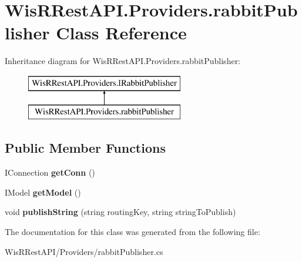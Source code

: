 \hypertarget{class_wis_r_rest_a_p_i_1_1_providers_1_1rabbit_publisher}{}\section{Wis\+R\+Rest\+A\+P\+I.\+Providers.\+rabbit\+Publisher Class Reference}
\label{class_wis_r_rest_a_p_i_1_1_providers_1_1rabbit_publisher}
Inheritance diagram for Wis\+R\+Rest\+A\+P\+I.\+Providers.\+rabbit\+Publisher\+:\begin{figure}[H]
\begin{center}
\leavevmode
\includegraphics[height=2.000000cm]{class_wis_r_rest_a_p_i_1_1_providers_1_1rabbit_publisher}
\end{center}
\end{figure}
\subsection*{Public Member Functions}
\begin{DoxyCompactItemize}
\item 
\hypertarget{class_wis_r_rest_a_p_i_1_1_providers_1_1rabbit_publisher_aaadcae2d519de0fd5b30ea10f8bec32c}{}I\+Connection {\bfseries get\+Conn} ()\label{class_wis_r_rest_a_p_i_1_1_providers_1_1rabbit_publisher_aaadcae2d519de0fd5b30ea10f8bec32c}

\item 
\hypertarget{class_wis_r_rest_a_p_i_1_1_providers_1_1rabbit_publisher_a55d48a958996ad4e1a0c218af2790706}{}I\+Model {\bfseries get\+Model} ()\label{class_wis_r_rest_a_p_i_1_1_providers_1_1rabbit_publisher_a55d48a958996ad4e1a0c218af2790706}

\item 
\hypertarget{class_wis_r_rest_a_p_i_1_1_providers_1_1rabbit_publisher_a906b31d6237ad9eed9e4c3b39488db51}{}void {\bfseries publish\+String} (string routing\+Key, string string\+To\+Publish)\label{class_wis_r_rest_a_p_i_1_1_providers_1_1rabbit_publisher_a906b31d6237ad9eed9e4c3b39488db51}

\end{DoxyCompactItemize}


The documentation for this class was generated from the following file\+:\begin{DoxyCompactItemize}
\item 
Wis\+R\+Rest\+A\+P\+I/\+Providers/rabbit\+Publisher.\+cs\end{DoxyCompactItemize}
